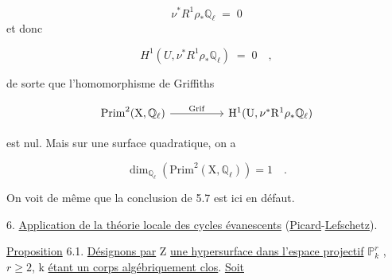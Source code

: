 \begin{equation*}
\nu^*R^1\rho_*\mathbb{Q}_\ell \;=\; 0
\end{equation*}
et donc

\begin{equation*}
H^1(U,\nu^*R^1\rho_*\mathbb{Q}_\ell) \;=\; 0 \quad , 
\end{equation*}


%
%
de sorte que l'homomorphisme de Griffiths

\begin{equation*}
\begin{tikzcd}[column sep=huge]
\mathrm{Prim}^2(\mathrm{X},\mathbb{Q}_\ell) \arrow[r, "\mathrm{Grif}"] & \mathrm{H}^1(\mathrm{U},\nu^*\mathrm{R}^1\rho_*\mathbb{Q}_\ell)
\end{tikzcd}
\end{equation*}

est nul. Mais sur une surface quadratique, on a

\begin{equation*}
\dim_{\mathbb{Q}_\ell} \left( \mathrm{Prim}^2(\mathrm{X},\mathbb{Q}_\ell) \right) = 1 \quad .
\end{equation*}

On voit de même que la conclusion de 5.7 est ici en défaut.

6. \underline{Application de la théorie locale des cycles évanescents} (\underline{Picard}-\underline{Lefschetz}).

\underline{Proposition} 6.1. \underline{Désignons par} Z \underline{une hypersurface dans l'espace projectif} $\mathbb{P}^r_k$ , $r \geq 2$, k \underline{étant un corps algébriquement clos}. \underline{Soit}

